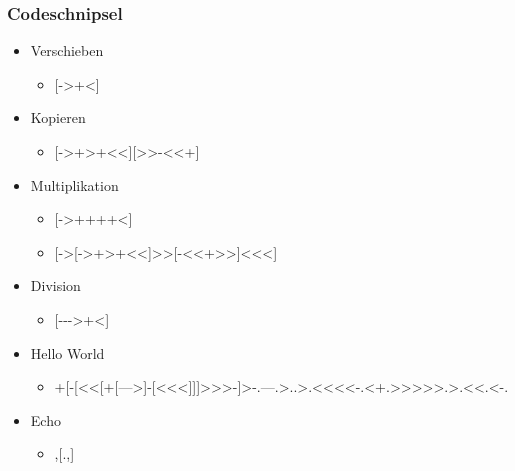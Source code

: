 \documentclass[aspectratio=169]{beamer}
\begin{document}
\begin{frame}[t]
	\frametitle{Codeschnipsel}
  \begin{itemize}
    \item<+-> Verschieben
    \begin{itemize}
      \item<+-> {} [->+<]
    \end{itemize}
    \item<+-> Kopieren
    \begin{itemize}
      \item<+-> {} [->+>+<{}<][>{}>-<{}<+]
    \end{itemize}
    \item<+-> Multiplikation
    \begin{itemize}
      \item<+-> {} [->++++<]
      \item<+-> {} [->[->+>+<{}<]>{}>[-<{}<+>{}>]<{}<{}<]
    \end{itemize}
    \item<+-> Division
    \begin{itemize}
      \item<+-> {} [-{}-{}->+<]
    \end{itemize}
    \item<+-> Hello World
    \begin{itemize}
      \item<+-> {} +[-[<{}<[+[--->]-[<{}<{}<]]]>{}>{}>-]>-.---.>..>.<{}<{}<{}<-.<+.>{}>{}>{}>{}>.>.<{}<.<-.
    \end{itemize}
    \item<+-> Echo
    \begin{itemize}
      \item<+-> ,[.,]
    \end{itemize}
  \end{itemize}
\end{frame}
\end{document}

